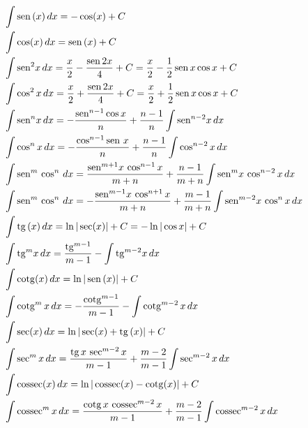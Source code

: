 \cleardoublepage\documentclass[../main.tex]{subfiles}
\begin{document}
\begin{align}
  & \int \sen(x)\,dx = -\cos(x) + C \\
  & \int \cos(x)\,dx = \sen(x) + C \\
  & \intg{\sin\!\!^2 x}=\frac{x}{2}-\frac{\sin\! 2x}{4}+C=\frac{x}{2}-\frac{1}{2}\sin\! x \cos x+C\\
  & \intg{\cos^2 x}=\frac{x}{2}+\frac{\sin\! 2x}{4}+C=\frac{x}{2}+\frac{1}{2}\sin\! x \cos x+C\\
  & \intg{\sin\!\!^n x}=-\frac{\sin\!\!^{n-1}\cos x}{n}+\frac{n-1}{n}\intg{\sin\!\!^{n-2} x}\\
  & \intg{\cos ^n x}=-\frac{\cos^{n-1}\sin x}{n}+\frac{n-1}{n}\intg{\cos^{n-2} x}\\
  & \intg{\sin\!\!^m\, \cos^n}=\frac{\sin\!\!^{m+1} x\, \cos^{n-1} x}{m+n}+\frac{n-1}{m+n}\intg{ \sin\!\!^m x\, \cos^{n-2} x}\\
   & \intg{\sin\!\!^m\, \cos^n}=-\frac{\sin\!\!^{m-1} x\, \cos^{n+1} x}{m+n}+\frac{m-1}{m+n}\intg{ \sin\!\!^{m-2} x\, \cos^{n} x}\\
  & \int \tg(x)\,dx = \ln|\sec(x)| + C=-\ln|\cos x|+C \\
  & \intg{\tg\!\!^m x}=\frac{\tg\!\!^{m-1}}{m-1}-\intg{\tg\!\!^{m-2} x}\\
  & \int \cotg(x)\,dx = \ln|\sen(x)| + C \\
  &  \intg{\cotg^m x}=-\frac{\cotg^{m-1}}{m-1}-\intg{\cotg^{m-2} x}\\
    & \int \sec(x)\,dx = \ln|\sec(x)+\tg(x)| + C \\
    & \intg{\sec^m x}=\frac{\tg\! x \, \sec^{m-2} x}{m-1}+\frac{m-2}{m-1}\intg{\sec^{m-2} x}\\
  & \int \cossec(x)\,dx = \ln|\cossec(x)-\cotg(x)| + C\\
  & \intg{\cossec^m x}=\frac{\cotg x \, \cossec^{m-2} x}{m-1}+\frac{m-2}{m-1}\intg{\cossec^{m-2} x}
\end{align}
\end{document}
